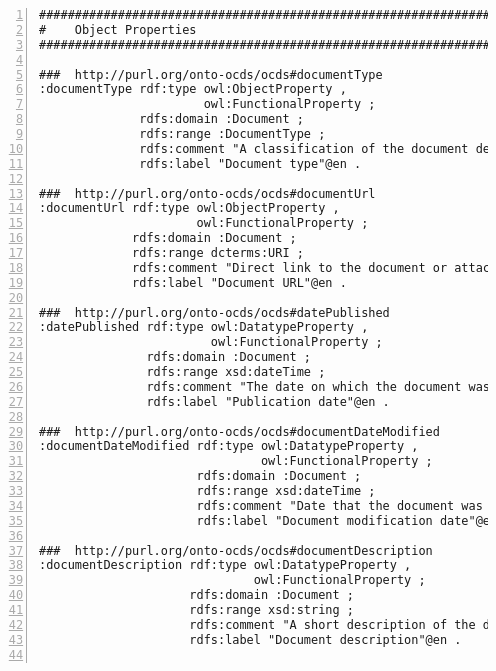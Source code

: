 \begin{minipage}{\textwidth}
\begin{lstlisting}[captionpos=b, caption={Extracto de código de la ontología OCDSPY}, label={lst:ocdspyAnexo},  numbers=left,  numberstyle=\tiny\color{mygray},frame=single]
#################################################################
#    Object Properties
#################################################################

###  http://purl.org/onto-ocds/ocds#documentType
:documentType rdf:type owl:ObjectProperty ,
                       owl:FunctionalProperty ;
              rdfs:domain :Document ;
              rdfs:range :DocumentType ;
              rdfs:comment "A classification of the document described taken from the [documentType codelist](http://standard.open-contracting.org/latest/en/schema/codelists/#document-type). Values from the provided codelist should be used wherever possible, though extended values can be provided if the codelist does not have a relevant code."@en ;
              rdfs:label "Document type"@en .

###  http://purl.org/onto-ocds/ocds#documentUrl
:documentUrl rdf:type owl:ObjectProperty ,
                      owl:FunctionalProperty ;
             rdfs:domain :Document ;
             rdfs:range dcterms:URI ;
             rdfs:comment "Direct link to the document or attachment. The server providing access to this document should be configured to correctly report the document mime type."@en ;
             rdfs:label "Document URL"@en .

###  http://purl.org/onto-ocds/ocds#datePublished
:datePublished rdf:type owl:DatatypeProperty ,
                        owl:FunctionalProperty ;
               rdfs:domain :Document ;
               rdfs:range xsd:dateTime ;
               rdfs:comment "The date on which the document was first published. This is particularly important for legally important documents such as notices of a tender."@en ;
               rdfs:label "Publication date"@en .

###  http://purl.org/onto-ocds/ocds#documentDateModified
:documentDateModified rdf:type owl:DatatypeProperty ,
                               owl:FunctionalProperty ;
                      rdfs:domain :Document ;
                      rdfs:range xsd:dateTime ;
                      rdfs:comment "Date that the document was last modified"@en ;
                      rdfs:label "Document modification date"@en .

###  http://purl.org/onto-ocds/ocds#documentDescription
:documentDescription rdf:type owl:DatatypeProperty ,
                              owl:FunctionalProperty ;
                     rdfs:domain :Document ;
                     rdfs:range xsd:string ;
                     rdfs:comment "A short description of the document. We recommend descriptions do not exceed 250 words. In the event the document is not accessible online, the description field can be used to describe arrangements for obtaining a copy of the document."@en ;
                     rdfs:label "Document description"@en .


\end{lstlisting}
\end{minipage}
